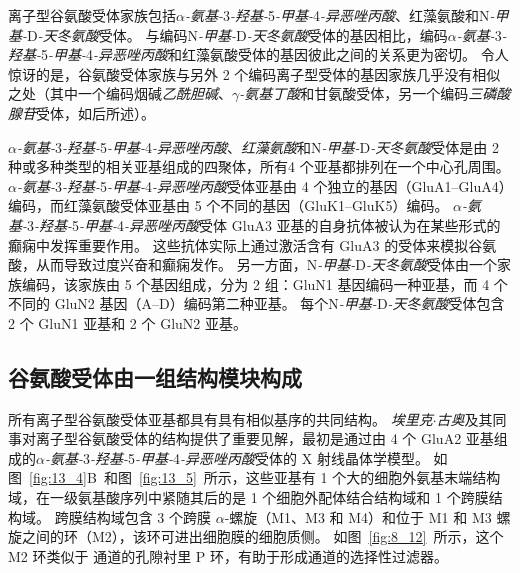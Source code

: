 离子型谷氨酸受体家族包括\textit{$\alpha$-氨基-}3\textit{-羟基-}5\textit{-甲基-}4\textit{-异恶唑丙酸}、红藻氨酸和N\textit{-甲基-}D\textit{-天冬氨酸}受体。
与编码N\textit{-甲基-}D\textit{-天冬氨酸}受体的基因相比，编码\textit{$\alpha$-氨基-}3\textit{-羟基-}5\textit{-甲基-}4\textit{-异恶唑丙酸}和红藻氨酸受体的基因彼此之间的关系更为密切。
令人惊讶的是，谷氨酸受体家族与另外 2 个编码离子型受体的基因家族几乎没有相似之处（其中一个编码烟碱\textit{乙酰胆碱}、\textit{$\gamma$-氨基丁酸}和甘氨酸受体，另一个编码\textit{三磷酸腺苷}受体，如后所述）。


\textit{$\alpha$-氨基-}3\textit{-羟基-}5\textit{-甲基-}4\textit{-异恶唑丙酸}、\textit{红藻氨酸}和N\textit{-甲基-}D\textit{-天冬氨酸}受体是由 2 种或多种类型的相关亚基组成的四聚体，所有4 个亚基都排列在一个中心孔周围。
\textit{$\alpha$-氨基-}3\textit{-羟基-}5\textit{-甲基-}4\textit{-异恶唑丙酸}受体亚基由 4 个独立的基因（GluA1–GluA4）编码，而红藻氨酸受体亚基由 5 个不同的基因（GluK1–GluK5）编码。
\textit{$\alpha$-氨基-}3\textit{-羟基-}5\textit{-甲基-}4\textit{-异恶唑丙酸}受体 GluA3 亚基的自身抗体被认为在某些形式的癫痫中发挥重要作用。
这些抗体实际上通过激活含有 GluA3 的受体来模拟谷氨酸，从而导致过度兴奋和癫痫发作。
另一方面，N\textit{-甲基-}D\textit{-天冬氨酸}受体由一个家族编码，该家族由 5 个基因组成，分为 2 组：GluN1 基因编码一种亚基，而 4 个不同的 GluN2 基因（A–D）编码第二种亚基。
每个N\textit{-甲基-}D\textit{-天冬氨酸}受体包含 2 个 GluN1 亚基和 2 个 GluN2 亚基。



\subsection{谷氨酸受体由一组结构模块构成}

所有离子型谷氨酸受体亚基都具有具有相似基序的共同结构。
\textit{埃里克$\cdot$古奥}及其同事对离子型谷氨酸受体的结构提供了重要见解，最初是通过由 4 个 GluA2 亚基组成的\textit{$\alpha$-氨基-}3\textit{-羟基-}5\textit{-甲基-}4\textit{-异恶唑丙酸}受体的 X 射线晶体学模型。
如图~\ref{fig:13_4}B~和图~\ref{fig:13_5}~所示，这些亚基有 1 个大的细胞外氨基末端结构域，在一级氨基酸序列中紧随其后的是 1 个细胞外配体结合结构域和 1 个跨膜结构域。
跨膜结构域包含 3 个跨膜 $\alpha$-螺旋（M1、M3 和 M4）和位于 M1 和 M3 螺旋之间的环（M2），该环可进出细胞膜的细胞质侧。
如图~\ref{fig:8_12}~所示，这个 M2 环类似于  通道的孔隙衬里 P 环，有助于形成通道的选择性过滤器。


